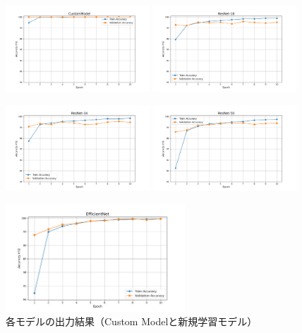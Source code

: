 \documentclass[a4paper,11pt,titlepage]{jsarticle}
\begin{document}
\begin{figure}[H]
  \centering

  \includegraphics[width=0.48\textwidth]{CustomModel_output.png}
  \includegraphics[width=0.48\textwidth]{ResNet-18_output.png}
  
  \vspace{0.3cm} %

  \includegraphics[width=0.48\textwidth]{ResNet-34_output.png}
  \includegraphics[width=0.48\textwidth]{ResNet-50_output.png}
  
  \vspace{0.3cm}

  \includegraphics[width=0.6\textwidth]{EfficientNet_output.png}

  \caption{各モデルの出力結果（Custom Modelと新規学習モデル）}
  \label{fig:model_outputs_sorted}
\end{figure}
\end{document}
